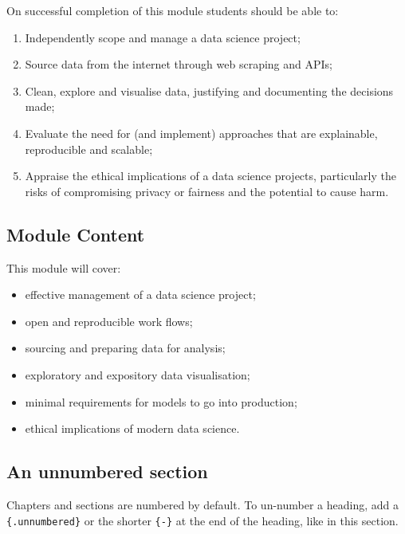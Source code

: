 \documentclass[
  12pt,
]{book}
\providecommand{\tightlist}{%
  \setlength{\itemsep}{0pt}\setlength{\parskip}{0pt}}
\theoremstyle{definition}
\theoremstyle{definition}
\theoremstyle{definition}
\theoremstyle{definition}
\theoremstyle{remark}
\begin{document}
On successful completion of this module students should be able to:

\begin{enumerate}
\def\labelenumi{\arabic{enumi}.}
\tightlist
\item
  Independently scope and manage a data science project;
\item
  Source data from the internet through web scraping and APIs;
\item
  Clean, explore and visualise data, justifying and documenting the decisions made;
\item
  Evaluate the need for (and implement) approaches that are explainable, reproducible and scalable;
\item
  Appraise the ethical implications of a data science projects, particularly the risks of compromising privacy or fairness and the potential to cause harm.
\end{enumerate}

\hypertarget{module-content}{%
\subsection{Module Content}\label{module-content}}

This module will cover:

\begin{itemize}
\tightlist
\item
  effective management of a data science project;
\item
  open and reproducible work flows;
\item
  sourcing and preparing data for analysis;
\item
  exploratory and expository data visualisation;
\item
  minimal requirements for models to go into production;
\item
  ethical implications of modern data science.
\end{itemize}

\hypertarget{an-unnumbered-section}{%
\subsection*{An unnumbered section}\label{an-unnumbered-section}}

Chapters and sections are numbered by default. To un-number a heading, add a \texttt{\{.unnumbered\}} or the shorter \texttt{\{-\}} at the end of the heading, like in this section.
\end{document}
